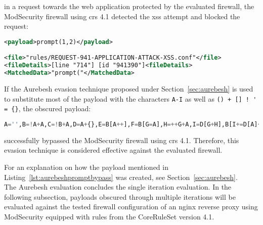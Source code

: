 in a request towards the web application protected by the evaluated firewall, the ModSecurity firewall using \acrshort{crs} 4.1 detected the \acrshort{xss} attempt and blocked the request:

\begin{lstlisting}[style=ruleStyle, language=XML, caption={prompt(1,2) blocked}, label=lst:promptblocked]
<payload>prompt(1,2)</payload>

<file>"rules/REQUEST-941-APPLICATION-ATTACK-XSS.conf"</file>
<fileDetails>[line "714"] [id "941390"]<fileDetails>
<MatchedData>"prompt("</MatchedData>
\end{lstlisting}

If the Aurebesh evasion technique proposed under Section~\ref{sec:aurebesh} is used to substitute most of the payload with the characters \verb|A-I| as well as \verb|() + [] ! ' = {}|, the obscured payload: 

\begin{lstlisting}[style=basicStyle, language=Python, caption=Aurebesh.js bypass, label={lst:aurebeshpromptbypass}]
A='',B=!A+A,C=!B+A,D=A+{},E=B[A++],F=B[G=A],H=++G+A,I=D[G+H],B[I+=D[A]+(B.C+D)[A]+C[H]+E+F+B[G]+I+E+D[A]+F][I]('p'+F+D[A]+'m'+'p'+E+'(A,++A)')()
\end{lstlisting}

successfully bypassed the ModSecurity firewall using \acrshort{crs} 4.1. Therefore, this evasion technique is considered effective against the evaluated firewall.

For an explanation on how the payload mentioned in Listing~\ref{lst:aurebeshpromptbypass} was created, see Section~\ref{sec:aurebesh}. \\

The Aurebesh evaluation concludes the single iteration evaluation. In the following subsection, payloads obscured through multiple iterations will be evaluated against the tested firewall configuration of an nginx reverse proxy using ModSecurity equipped with rules from the CoreRuleSet version 4.1.
